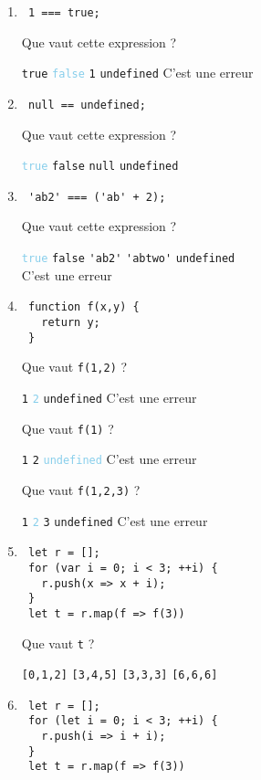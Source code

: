 \documentclass[a4paper, 12pt]{article}
\newcommand{\choice}[1]{\Square\hspace{2pt} #1\hspace{5pt}}
\newcommand{\choicec}[1]{\Square\hspace{2pt} \lstinline{#1}\hspace{5pt}}
\newcommand{\fullpoint}[1]{\textcolor{RubineRed}{#1}}
\newcommand{\halfpoint}[1]{\textcolor{SkyBlue}{#1}}
\newcommand{\choicecg}[1]{\fullpoint{\XBox\hspace{2pt} \lstinline{#1}\hspace{5pt}}}
\newcommand{\choicecgh}[1]{\halfpoint{\XBox\hspace{2pt} \lstinline{#1}\hspace{5pt}}}
\begin{document}
\begin{enumerate}
\item \lstset{language=javascript}
\begin{lstlisting}
 1 === true;
\end{lstlisting}

  Que vaut cette expression ?

  \choicec{true} \choicecgh{false} \choicec{1} \choicec{undefined} \choice{C'est une erreur}
\item \lstset{language=javascript}
\begin{lstlisting}
 null == undefined;
\end{lstlisting}

  Que vaut cette expression ?

  \choicecgh{true} \choicec{false} \choicec{null} \choicec{undefined}
\item \lstset{language=javascript}
\begin{lstlisting}
 'ab2' === ('ab' + 2);
\end{lstlisting}

  Que vaut cette expression ?

  \choicecgh{true} \choicec{false} \choicec{'ab2'} \choicec{'abtwo'}
  \choicec{undefined}\\\choice{C'est une erreur}
\item \begin{lstlisting}
 function f(x,y) {
   return y;
 }
\end{lstlisting}

  Que vaut \lstinline{f(1,2)} ?

  \choicec{1} \choicecgh{2} \choicec{undefined} \choice{C'est une erreur}

  Que vaut \lstinline{f(1)} ?

  \choicec{1} \choicec{2} \choicecgh{undefined} \choice{C'est une erreur}

  Que vaut \lstinline{f(1,2,3)} ?

  \choicec{1} \choicecgh{2} \choicec{3} \choicec{undefined} \choice{C'est une erreur}
\item \lstset{language=javascript}
\begin{lstlisting}
 let r = [];
 for (var i = 0; i < 3; ++i) {
   r.push(x => x + i);
 }
 let t = r.map(f => f(3))
\end{lstlisting}

  Que vaut \lstinline{t} ?

  \choicec{[0,1,2]} \choicec{[3,4,5]} \choicec{[3,3,3]} \choicecg{[6,6,6]}

\newpage
\item \lstset{language=javascript}
\begin{lstlisting}
 let r = [];
 for (let i = 0; i < 3; ++i) {
   r.push(i => i + i);
 }
 let t = r.map(f => f(3))
\end{lstlisting}


\end{enumerate}
\end{document}
